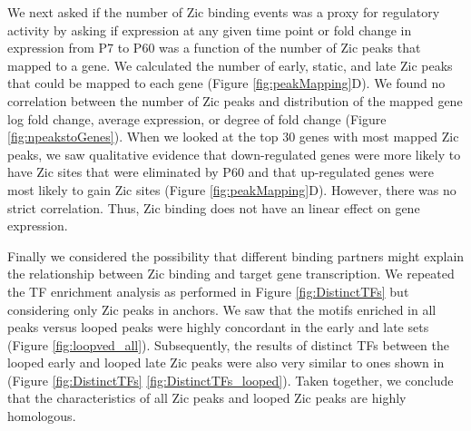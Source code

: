 \documentclass[fleqn,10pt]{wlscirep}
\begin{document}
We next asked if the number of Zic binding events was a proxy for regulatory activity by asking if expression at any given time point or fold change in expression from P7 to P60 was a function of the number of Zic peaks that mapped to a gene. We calculated the number of early, static, and late Zic peaks that could be mapped to each gene (Figure \ref{fig:peakMapping}D). We found no correlation between the number of Zic peaks and distribution of the mapped gene log fold change, average expression, or degree of fold change (Figure \ref{fig:npeakstoGenes}). When we looked at the top 30 genes with most mapped Zic peaks, we saw qualitative evidence that down-regulated genes were more likely to have Zic sites that were eliminated by P60 and that up-regulated genes were most likely to gain Zic sites (Figure \ref{fig:peakMapping}D). However, there was no strict correlation. Thus, Zic binding does not have an linear effect on gene expression.

Finally we considered the possibility that different binding partners might explain the relationship between Zic binding and target gene transcription. We repeated the TF enrichment analysis as performed in Figure \ref{fig:DistinctTFs} but considering only Zic peaks in anchors. We saw that the motifs enriched in all peaks versus looped peaks were highly concordant in the early and late sets (Figure \ref{fig:loopved_all}). Subsequently, the results of distinct TFs between the looped early and looped late Zic peaks were also very similar to ones shown in (Figure \ref{fig:DistinctTFs}  \ref{fig:DistinctTFs_looped}). Taken together, we conclude that the characteristics of all Zic peaks and looped Zic peaks are highly homologous.
\end{document}
